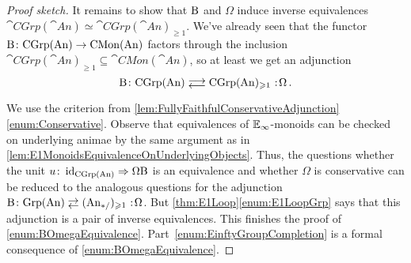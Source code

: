 \begin{proof}[Proof sketch]
	It remains to show that $\mathrm{B}$ and $\Omega$ induce inverse equivalences $\cat{CGrp}(\cat{An})\simeq \cat{CGrp}(\cat{An})_{\geqslant 1}$. We've already seen that the functor $\mathrm{B}\colon \mathrm{CGrp}(\mathrm{An})\rightarrow \mathrm{CMon}(\mathrm{An})$ factors through the inclusion $\cat{CGrp}(\cat{An})_{\geqslant 1}\subseteq \cat{CMon}(\cat{An})$, so at least we get an adjunction
	\begin{equation*}
		\B\colon \cat{CGrp}(\cat{An}) \doublelrmorphism \cat{CGrp}(\cat{An})_{\geqslant 1}\noloc \Omega\,.
	\end{equation*}
	We use the criterion from \cref{lem:FullyFaithfulConservativeAdjunction}\cref{enum:Conservative}. Observe that equivalences of $\mathbb{E}_\infty$-monoids can be checked on underlying animae by the same argument as in \cref{lem:E1MonoidsEquivalenceOnUnderlyingObjects}. Thus, the questions whether the unit $u\colon \operatorname{id}_{\mathrm{CGrp}(\mathrm{An})}\Rightarrow \Omega \mathrm{B}$ is an equivalence and whether $\Omega$ is conservative can be reduced to the analogous questions for the adjunction $\B\colon \cat{Grp}(\cat{An})\shortdoublelrmorphism (\cat{An}_{*/})_{\geqslant 1}\noloc \Omega$. But \cref{thm:E1Loop}\cref{enum:E1LoopGrp} says that this adjunction is a pair of inverse equivalences. This finishes the proof of \cref{enum:BOmegaEquivalence}. Part~\cref{enum:EinftyGroupCompletion} is a formal consequence of \cref{enum:BOmegaEquivalence}. 
\end{proof}
